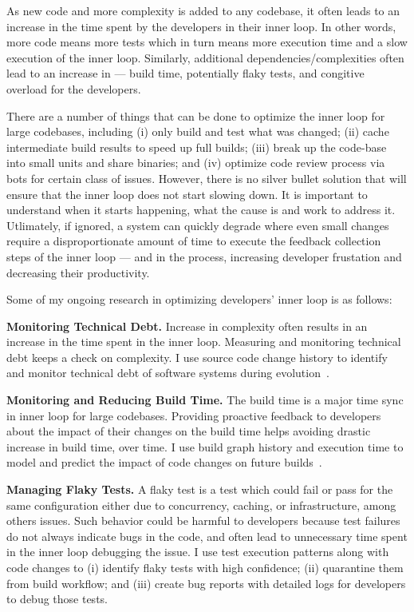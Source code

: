 \documentclass[a4paper]{article}
\begin{document}
As new code and more complexity is added to any codebase, it often leads to an increase in the time spent by the developers in their inner loop. In other words, more code means more tests which in turn means more execution time and a slow execution of the inner loop. Similarly, additional dependencies/complexities often lead to an increase in --- build time, potentially flaky tests, and congitive overload for the developers.

There are a number of things that can be done to optimize the inner loop for large codebases, including (i) only build and test what was changed; (ii) cache intermediate build results to speed up full builds; (iii) break up the code-base into small units and share binaries; and (iv) optimize code review process via bots for certain class of issues.
However, there is no silver bullet solution that will ensure that the inner loop does not start slowing down. It is important to understand when it starts happening, what the cause is and work to address it. Utlimately, if ignored, a system can quickly degrade where even small changes require a disproportionate amount of time to execute the feedback collection steps of the inner loop --- and in the process, increasing developer frustation and decreasing their productivity. 

Some of my ongoing research in optimizing developers' inner loop is as follows:  

\noindent \textbf{Monitoring Technical Debt.} Increase in complexity often results in an increase in the time spent in the inner loop. Measuring and monitoring technical debt keeps a check on complexity. I use source code change history to identify and monitor technical debt of software systems during evolution~\cite{activefiles}. 

\noindent \textbf{Monitoring and Reducing Build Time.} The build time is a major time sync in inner loop for large codebases.  Providing proactive feedback to developers about the impact of their changes on the build time helps avoiding drastic increase in build time, over time. I use build graph history and execution time to model and predict the impact of code changes on future builds~\cite{buildimpact}. 

\noindent \textbf{Managing Flaky Tests.}  A flaky test is a test which could fail or pass for the same configuration either due to concurrency, caching, or infrastructure, among others issues. Such behavior could be harmful to developers because test failures do not always indicate bugs in the code, and often lead to unnecessary time spent in the inner loop debugging the issue.  I use test execution patterns along with code changes to (i) identify flaky tests with high confidence; (ii) quarantine them from build workflow; and (iii) create bug reports with detailed logs for developers to debug those tests.
\end{document}
